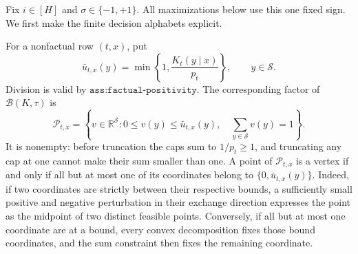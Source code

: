 Fix \(i\in[H]\) and \(\sigma\in\{-1,+1\}\).  All maximizations below use this one fixed sign.  We first make the finite decision alphabets explicit.

For a nonfactual row \((t,x)\), put
\[
 \bar u_{t,x}(y)=\min\!\left\{1,\frac{K_t(y\mid x)}{p_t}\right\},
 \qquad y\in\mathcal S.
\]
Division is valid by \(\texttt{ass:factual-positivity}\).  The corresponding factor of \(\mathcal B(K,\tau)\) is
\[
 \mathcal P_{t,x}
 =\left\{v\in\mathbb R^{\mathcal S}:
 0\le v(y)\le \bar u_{t,x}(y),\quad
 \sum_{y\in\mathcal S}v(y)=1\right\}.
\]
It is nonempty: before truncation the caps sum to \(1/p_t\ge1\), and truncating any cap at one cannot make their sum smaller than one.  A point of \(\mathcal P_{t,x}\) is a vertex if and only if all but at most one of its coordinates belong to \(\{0,\bar u_{t,x}(y)\}\).  Indeed, if two coordinates are strictly between their respective bounds, a sufficiently small positive and negative perturbation in their exchange direction expresses the point as the midpoint of two distinct feasible points.  Conversely, if all but at most one coordinate are at a bound, every convex decomposition fixes those bound coordinates, and the sum constraint then fixes the remaining coordinate.

